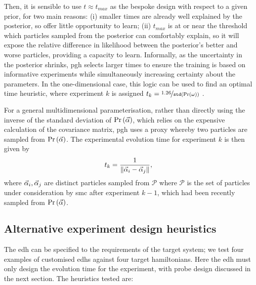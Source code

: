 Then, it is sensible to use $t \approx t_{max}$ as the bespoke design with respect to a given prior, 
for two main reasons: 
(i) smaller times are already well explained by the posterior, so offer little opportunity to learn;
(ii) $t_{max}$ is at or near the threshold which \glspl{particle} sampled from the posterior can comfortably explain, 
    so it will expose the relative difference in \gls{likelihood} between the posterior's better and worse \glspl{particle}, 
    providing a capacity to learn. 
Informally, as the uncertainty in the posterior shrinks, \gls{pgh} selects larger times 
to ensure the training is based on informative \glspl{experiment} while 
simultaneously increasing certainty about the parameters. 
In the one-dimensional case, this logic can be used to find an optimal time heuristic, 
where \gls{experiment} $k$ is assigned $t_k = \nicefrac{1.26}{\texttt{std}\left(\Pr(\omega)\right)}$ \cite{ferrie2013best}. 
\par
For a general multidimensional parameterisation, 
rather than directly using the inverse of the standard deviation of $\Pr \left(\vec{\alpha}\right)$, 
which relies on the expensive calculation of the covariance matrix, 
\gls{pgh} uses a proxy whereby two \glspl{particle} are sampled from $\Pr \left(\vec{\alpha}\right)$. 
The experimental evolution time for \gls{experiment} $k$ is then given by 
\begin{equation}
\label{eqn:pgh_time}
t_k = \frac{1}{\| \vec{\alpha}_i - \vec{\alpha}_j \|}, 
\end{equation}
where $\vec{\alpha}_i, \vec{\alpha}_j$ are distinct \glspl{particle} sampled from $\mathcal{P}$ where 
$\mathcal{P}$ is the set of \glspl{particle} under consideration by \gls{smc} after \gls{experiment} $k-1$, 
which had been recently sampled from $\Pr\left(\vec{\alpha}\right)$. 
\par 


\subsection{Alternative experiment design heuristics}\label{sec:alt_heuristics}
The \gls{edh} can be specified to the requirements of the target system; 
we test four examples of customised \glspl{edh} against four target \glspl{hamiltonian}.
Here the \gls{edh} must only design the evolution time for the experiment, 
with \gls{probe} design discussed in the next section. 
The heuristics tested are:

